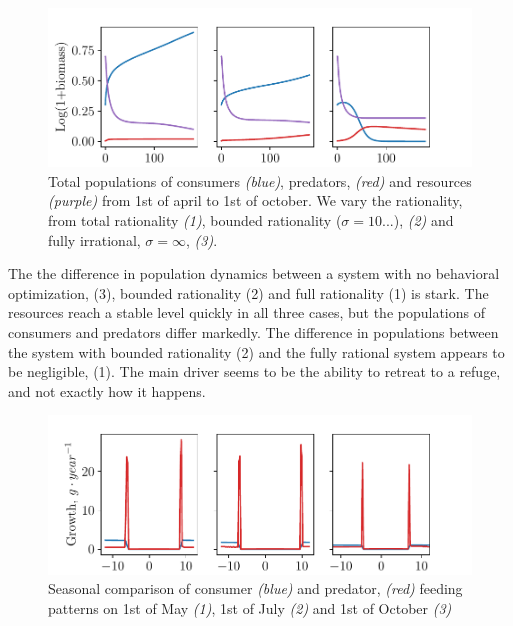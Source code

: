 \begin{figure}
\includegraphics{populations.pdf}
\caption{Total populations of consumers \emph{(blue)}, predators, \emph{(red)} and resources \emph{(purple)} from 1st of april to 1st of october. We vary the rationality, from total rationality \emph{(1)}, bounded rationality ($\sigma = 10...$), \emph{(2)} and fully irrational, $\sigma = \infty$, \emph{(3)}.}
\label{fig:long_term_populations}
\end{figure}
The the difference in population dynamics between a system with no behavioral optimization, (3), bounded rationality (2) and full rationality (1) is stark. The resources reach a stable level quickly in all three cases, but the populations of consumers and predators differ markedly. The difference in populations between the system with bounded rationality (2) and the fully rational system appears to be negligible, (1). The main driver seems to be the ability to retreat to a refuge, and not exactly how it happens.
\begin{figure}
\includegraphics{growth_short_rational.pdf}
\caption{Seasonal comparison of consumer \emph{(blue)} and predator, \emph{(red)} feeding patterns on 1st of May \emph{(1)}, 1st of July \emph{(2)} and 1st of October \emph{(3)}}
\end{figure}

